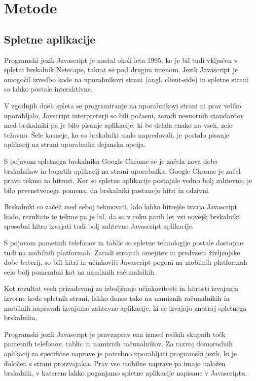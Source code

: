 \chapter{Metode}

\section{Spletne aplikacije}

Programski jezik Javascript je nastal okoli leta 1995, ko je bil tudi vključen v spletni brskalnik Netscape, takrat se pod drugim imenom. Jezik Javascript je omogočil izvedbo kode na uporabnikovi strani (angl. client-side) in spletne strani so lahko postale interaktivne.

V zgodnjih dneh spleta se programiranje na uporabnikovi strani ni prav veliko uporabljalo, Javscript interpreterji so bili počasni, zaradi neenotnih standardov med brskalniki pa je bilo pisanje aplikacije, ki be delala enako na vseh, zelo težavno. Šele kasneje, ko so brskalniki malo napredovali, je postalo pisanje aplikacij na strani uporabnika dejanska opcija.

S pojavom spletnega brskalnika Google Chrome se je začela nova doba brskalnikov in bogatih aplikacij na strani uporabnika. Google Chrome je začel pravo tekmo za hitrost. Ker so spletne aplikacije postajale vedno bolj zahtevne, je bilo prvenstvenega pomena, da brskalniki postanejo hitri in odzivni.

Brskalniki so začeli med seboj tekmovati, kdo lahko hitrejše izvaja Javascript kodo, rezultate te tekme pa je bil, da so v roku parih let vsi novejši brskalniki sposobni hitro izvajati tudi bolj zahtevne Javascript aplikacije. 

S pojavom pametnih telefonov in tablic so spletne tehnologije postale dostopne tudi na mobilnih platformah. Zaradi strojnih omejitev in predvsem življenjske dobe baterij, so bili hitri in učinkoviti Javascript pogoni na mobilnih platformah celo bolj pomembni kot na namiznih računalnikih.

Kot rezultat vseh prizadevanj za izboljšanje učinkovitosti in hitrosti izvajanja izvorne kode spletnih strani, lahko danes tako na namiznih računalnikih in mobilnih napravah izvajamo zahtevne aplikacije, ki se izvajajo znotraj spletnega brskalnika.

Programski jezik Javascript je pravzaprav ena izmed redkih skupnih točk pametnih telefonov, tablic in namiznih računalnikov. Za razvoj domorodnih aplikacij za specifične naprave je potrebno uporabljati programski jezik, ki je določen s strani proizvajalca. Prav vse mobilne naprave pa imajo naložen brskalnik, v katerem lahko poganjamo spletne aplikacije napisane v Javascriptu.


